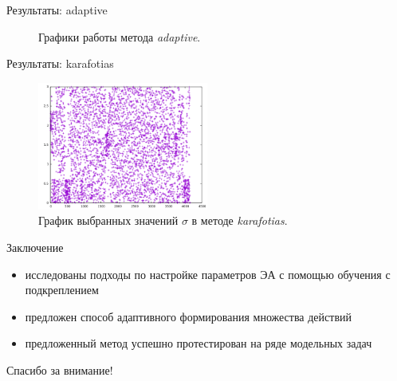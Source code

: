 \documentclass[hyperref=unicode,graphics=pdflatex,13pt]{beamer}
\begin{document}
\begin{frame}{Результаты: adaptive}
	\begin{figure}
	  \centering
	  \caption{ Графики работы метода \textit{adaptive}.}
	\end{figure}
\end{frame}

\begin{frame}{Результаты: karafotias}
	\begin{figure}
	  \centering
	  \includegraphics[width=0.5\textwidth]{karafotias_sphere.png}
	  \caption{График выбранных значений $\sigma$ в методе \textit{karafotias}.}
	\end{figure}
\end{frame}

\begin{frame}{Заключение}
    \begin{itemize}
        \item исследованы подходы по настройке параметров ЭА с помощью обучения с подкреплением
        \item предложен способ адаптивного формирования множества действий
        \item предложенный метод успешно протестирован на ряде модельных задач
    \end{itemize}
\end{frame}

\begin{frame}
    \begin{center}
        Спасибо за внимание!
    \end{center}
\end{frame}
\end{document}
